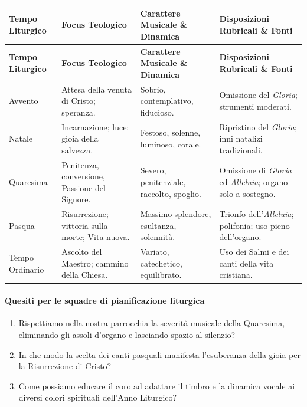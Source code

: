 \documentclass[12pt,a4paper]{article}
\begin{document}
	\begin{longtable}{L{2.5cm}L{3cm}L{3.5cm}L{4cm}}
		\toprule
		\textbf{Tempo Liturgico} & \textbf{Focus Teologico} & \textbf{Carattere Musicale \& Dinamica} & \textbf{Disposizioni Rubricali \& Fonti} \\
		\midrule
		\endfirsthead
		\toprule
		\textbf{Tempo Liturgico} & \textbf{Focus Teologico} & \textbf{Carattere Musicale \& Dinamica} & \textbf{Disposizioni Rubricali \& Fonti} \\
		\midrule
		\endhead
		\bottomrule
		\endlastfoot
		Avvento & Attesa della venuta di Cristo; speranza. & Sobrio, contemplativo, fiducioso. & Omissione del \emph{Gloria}; strumenti moderati. \\
		Natale & Incarnazione; luce; gioia della salvezza. & Festoso, solenne, luminoso, corale. & Ripristino del \emph{Gloria}; inni natalizi tradizionali. \\
		Quaresima & Penitenza, conversione, Passione del Signore. & Severo, penitenziale, raccolto, spoglio. & Omissione di \emph{Gloria} ed \emph{Alleluia}; organo solo a sostegno. \\
		Pasqua & Risurrezione; vittoria sulla morte; Vita nuova. & Massimo splendore, esultanza, solennità. & Trionfo dell'\emph{Alleluia}; polifonia; uso pieno dell'organo. \\
		Tempo Ordinario & Ascolto del Maestro; cammino della Chiesa. & Variato, catechetico, equilibrato. & Uso dei Salmi e dei canti della vita cristiana. \\
	\end{longtable}
	
	\paragraph{Quesiti per le squadre di pianificazione liturgica}\label{quesiti-per-le-squadre-di-pianificazione-liturgica}
	
	\begin{enumerate}[label=\arabic*.,leftmargin=*]
		\item Rispettiamo nella nostra parrocchia la severità musicale della Quaresima, eliminando gli assoli d'organo e lasciando spazio al silenzio?
		\item In che modo la scelta dei canti pasquali manifesta l'esuberanza della gioia per la Risurrezione di Cristo?
		\item Come possiamo educare il coro ad adattare il timbro e la dinamica vocale ai diversi colori spirituali dell'Anno Liturgico?
	\end{enumerate}
	
\end{document}
